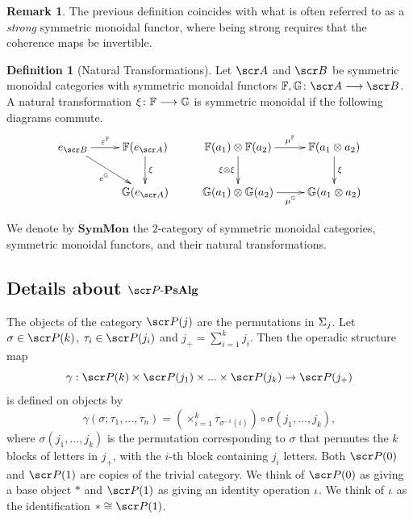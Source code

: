 \documentclass{amsart}
\theoremstyle{definition}
\newtheorem{defn}{Definition}[section]
\newtheorem{rem}{Remark}[section]
\numberwithin{equation}{section}
\newcommand{\PPs}{\sP\text{-}\mathbf{PsAlg}}
\newcommand{\SM}{\mathbf{SymMon}}
\begin{document}
\begin{rem}
The  previous definition coincides with what is often referred to as a \textit{strong} symmetric monoidal functor, where being strong requires that the coherence maps be invertible. 
\end{rem}

\begin{defn}[Natural Transformations]\label{SMMap2}
Let $\sA$ and $\sB$ be symmetric monoidal categories with symmetric monoidal functors $\bF, \bG\colon \sA \rtarr \sB$. A natural transformation $\xi\colon \mathbb{F} \longrightarrow \mathbb{G}$ is symmetric monoidal if the following diagrams commute.
$$\xymatrix{
e_{\sB} \ar[r]^-{\epz^{\bF}} \ar[dr]_{e^{\bG}} & \bF(e_{\sA}) \ar[d]^{\xi}  
& \bF(a_1) \otimes \bF(a_2) \ar[r]^-{\mu^{\bF}} \ar[d]_{\xi\otimes \xi} & \bF(a_1\otimes a_2) \ar[d]^{\xi}\\
& \bG(e_{\sA}) 
& \bG(a_1) \otimes \bG(a_2) \ar[r]_-{\mu^{\bG}}  & \bG(a_1\otimes a_2)\\}
$$
\end{defn}

We denote by $\SM$ the $2$-category of symmetric monoidal categories, symmetric monoidal functors, and their natural transformations. 


\subsection{Details about $\PPs$}\label{PPsdetails}

The objects of the category $\sP(j)$ are the permutations in $\Sigma_j$.  Let $\sigma\in \sP(k)$, $\tau_i\in \sP(j_i)$ and $j_+ = \sum^k_{i=1} j_i$. Then the operadic structure map 
$$\gamma: \sP(k)\times\sP(j_1)\times...\times\sP(j_k)\rightarrow\sP(j_+)$$ 
is defined on objects by
$$\gamma(\sigma; \tau_1,...,\tau_n) = (\times^k_{i=1} \tau_{\sigma^{-1}(i)})\circ \sigma(j_1,...,j_k),$$ 
where $\sigma(j_1,...,j_k)$ is the permutation corresponding to $\sigma$ that permutes the $k$ blocks of letters in $j_+$, with the $i$-th block containing $j_i$ letters. Both $\sP(0)$ and $\sP(1)$ are copies of the trivial category.  We think of $\sP(0)$ as giving a base object $\ast$ and $\sP(1)$ as giving an identity operation $\iota$.  We think of $\iota$ as the identification 
$\ast \iso \sP(1)$.
\end{document}
